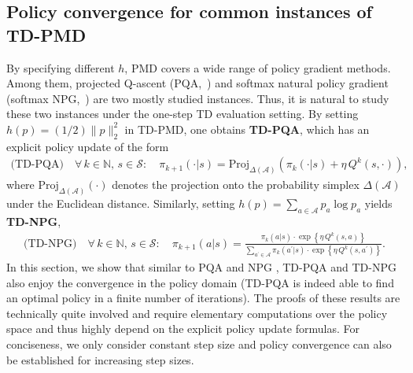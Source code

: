 \documentclass[10pt]{article}
\newcommand{\Proj}{\text{Proj}}
\newcommand{\calA}{\mathcal{A}}
\newcommand{\calS}{\mathcal{S}}
\newcommand{\ls}{\left}
\newcommand{\rs}{\right}
\theoremstyle{plain}
\theoremstyle{definition}
\begin{document}
\subsection{Policy convergence for common instances of TD-PMD}
\label{sec:TD-PQA-and-TD-NPG}
By specifying different $h$, PMD covers a wide range of policy gradient methods. Among them, projected Q-ascent (PQA,~\cite{Xiao_2022,ppgliu}) and softmax natural policy gradient (softmax NPG,~\cite{kakade2002npg,Agarwal_Kakade_Lee_Mahajan_2019,Khodadadian_Jhunjhunwala_Varma_Maguluri_2021,pg-liu,Xiao_2022})   are two mostly studied instances. Thus, it is natural to study these two instances under the one-step TD evaluation setting. By setting $h(p)=(1/2) \| p \|_2^2$ in TD-PMD, one obtains \textbf{TD-PQA}, which has an explicit policy update of the form 
\begin{align}
    \mbox{(TD-PQA)} \quad \forall\, k\in\mathbb{N}, \, s\in\calS: \quad \pi_{k+1}(\cdot|s) = \Proj_{\Delta(\calA)} \ls( \pi_k(\cdot|s) + \eta\, Q^k(s,\cdot) \rs),
    \label{eq:TD-PQA-update}
\end{align}
where $\Proj_{\Delta(\calA)}(\cdot)$ denotes the  projection onto the probability simplex $\Delta(\calA)$ under the Euclidean distance. Similarly, setting $h(p)=\sum_{a\in\calA}p_a \log p_a$ yields  \textbf{TD-NPG},
\begin{align}
    \mbox{(TD-NPG)} \quad \forall\, k\in\mathbb{N}, \, s\in\calS: \quad \pi_{k+1}(a|s) = \frac{\pi_k(a|s) \cdot \exp \ls\{ \eta\, Q^k(s,a) \rs\}}{\sum_{a^\prime\in\calA} \pi_k(a^\prime|s) \cdot \exp \ls\{ \eta\, Q^k(s,a^\prime) \rs\}}.
    \label{eq:TD-NPG-update}
\end{align}
In this section, we show that similar to PQA and NPG \cite{ppgliu,li2025phi}, TD-PQA and TD-NPG also enjoy the convergence in the policy domain (TD-PQA is indeed able to find an optimal policy in a finite number of iterations). The proofs of these results are technically quite involved and  require elementary computations over the policy space and thus highly depend on the explicit policy update formulas. {For conciseness, we only consider constant step size and policy convergence can also be established for increasing step sizes.}
\end{document}
